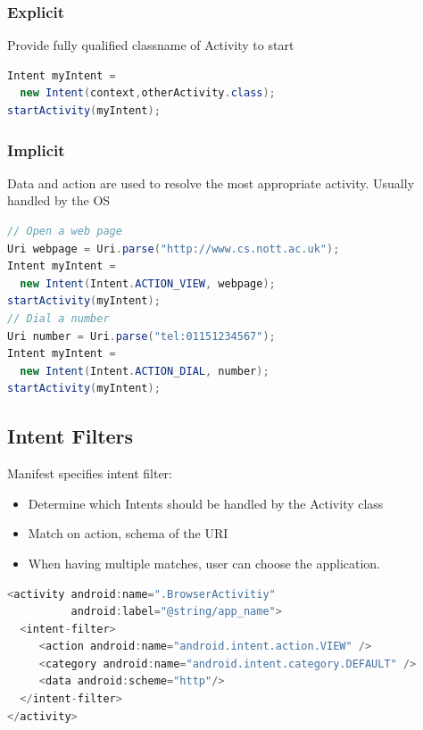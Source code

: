 \documentclass{article}
\begin{document}
\begin{multicols}{2}

\subsubsection{Explicit}
Provide fully qualified classname of Activity to start
\begin{lstlisting}[language=Java, basicstyle=\small]
Intent myIntent =
  new Intent(context,otherActivity.class);
startActivity(myIntent);
\end{lstlisting}

\vfill\null
\columnbreak

\subsubsection{Implicit}
Data and action are used to resolve the most appropriate activity. Usually handled by the OS
\begin{lstlisting}[language=Java,basicstyle=\small]
// Open a web page
Uri webpage = Uri.parse("http://www.cs.nott.ac.uk");
Intent myIntent =
  new Intent(Intent.ACTION_VIEW, webpage);
startActivity(myIntent);
// Dial a number
Uri number = Uri.parse("tel:01151234567");
Intent myIntent =
  new Intent(Intent.ACTION_DIAL, number);
startActivity(myIntent);
\end{lstlisting}
\end{multicols}

\pagebreak

\subsection{Intent Filters}

Manifest specifies intent filter:
\begin{itemize}
  \item Determine which Intents should be handled by the Activity class
  \item Match on action, schema of the URI
  \item When having multiple matches, user can choose the application.
\end{itemize}

\begin{lstlisting}[language=Java]
<activity android:name=".BrowserActivitiy"
          android:label="@string/app_name">
  <intent-filter>
     <action android:name="android.intent.action.VIEW" />
     <category android:name="android.intent.category.DEFAULT" />
     <data android:scheme="http"/>
  </intent-filter>
</activity>
\end{lstlisting}
\end{document}
